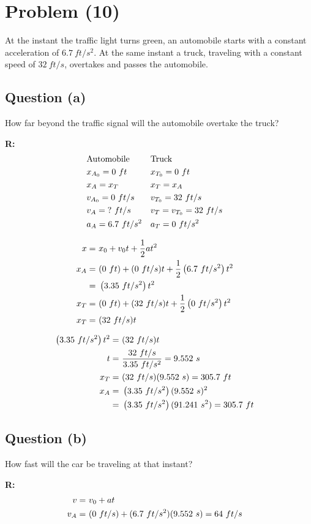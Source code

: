 \section{Problem (10)}
	At the instant the traffic light turns green, an automobile starts with a constant acceleration of $6.7 \ ft/s^{2}$. At the same instant a truck, traveling with a constant speed of $32 \ ft/s$, overtakes and passes the automobile.

	\subsection{Question (a)}
		How far beyond the traffic signal will the automobile overtake the truck?

		\textbf{R:} \newline
		\begin{align}
			&\text{Automobile}& &\text{Truck}& \notag \\
			&x_{A_{0}} = 0 \ ft& &x_{T_{0}} = 0 \ ft& \notag \\
			&x_{A} = x_{T}& &x_{T} = x_{A}& \notag \\
			&v_{A_{0}} = 0 \ ft/s& &v_{T_{0}} = 32 \ ft/s& \notag \\
			&v_{A} = \text{?} \ ft/s& &v_{T} = v_{T_{0}} = 32 \ ft/s& \notag \\
			&a_{A} = 6.7 \ ft/s^{2}& &a_{T} = 0 \ ft/s^{2}& \notag
		\end{align}

		\begin{align}
			x = \ &x_{0} + v_{0}t + \frac{1}{2}at^{2}& \notag \\
			x_{A} = \ &(0 \ ft) + (0 \ ft/s)t + \frac{1}{2} \left( 6.7 \ ft/s^{2} \right) t^{2}& \notag \\
			= \ & \left( 3.35 \ ft/s^{2} \right) t^{2}& \notag \\
			x_{T} = \ &(0 \ ft) + (32 \ ft/s)t + \frac{1}{2} \left( 0 \ ft/s^{2} \right) t^{2}& \notag \\
			x_{T} = \ &(32 \ ft/s)t& \notag
		\end{align}

		\begin{align}
			\left( 3.35 \ ft/s^{2} \right) t^{2} = \ &(32 \ ft/s)t& \notag \\
			t = \ &\frac{32 \ ft/s}{3.35 \ ft/s^{2}} = 9.552 \ s& \notag \\
			x_{T} = \ &(32 \ ft/s)(9.552 \ s) = 305.7 \ ft& \\
			x_{A} = \ & \left( 3.35 \ ft/s^{2} \right) (9.552 \ s)^{2}& \notag \\
			= \ & \left( 3.35 \ ft/s^{2} \right) (91.241 \ s^{2}) = 305.7 \ ft&
		\end{align}
	\subsection{Question (b)}
		How fast will the car be traveling at that instant?

		\textbf{R:} \newline
		\begin{align}
			v = \ &v_{0} + at& \notag \\
			v_{A} = \ &(0 \ ft/s) + (6.7 \ ft/s^{2})(9.552 \ s) = 64 \ ft/s& \notag \\
		\end{align}
